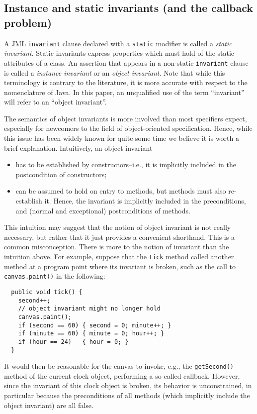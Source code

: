\documentclass{llncs}
\begin{document}
\subsection{Instance and static invariants (and the callback problem)}

A JML \texttt{invariant} clause declared with a
\texttt{static} modifier is called a \emph{static invariant}.
%
Static invariants express properties which must hold of the static
attributes of a class.
%
An assertion that appears in a non-static \texttt{invariant} clause is called
a \emph{instance invariant} or an \emph{object invariant}.
%
Note that while this terminology is contrary to the literature, it is more
accurate with respect to the nomenclature of Java.  In this paper, an
unqualified use of the term ``invariant'' will refer to an ``object
invariant''.

The semantics of object invariants is more involved than most specifiers
expect, especially for newcomers to the field of object-oriented specification.
Hence, while this issue has been widely known for quite some time
\cite{Szyperski98} we believe it is worth a brief explanation.
%
Intuitively, an object invariant
\begin{itemize}
  \item  has to be established by constructors--i.e., it is implicitly
    included in the postcondition of constructors;
  \item can be assumed to hold on entry to methods, but methods must also
    re-establish it. Hence, the invariant is implicitly included in the
    preconditions, and (normal and exceptional) postconditions of methods.
\end{itemize}

This intuition may suggest that the notion of object invariant is not really
necessary, but rather that it just provides a convenient shorthand.  This is a
common misconception.
%
There is more to the notion of invariant than the intuition above.
%
For example, suppose that the \texttt{tick} method called another method
at a program point where its invariant is broken, such as the call to
\texttt{canvas.paint()} in the following:
\begin{verbatim}
  public void tick() {
    second++;
    // object invariant might no longer hold
    canvas.paint();
    if (second == 60) { second = 0; minute++; }
    if (minute == 60) { minute = 0; hour++; }
    if (hour == 24)   { hour = 0; }
  }
\end{verbatim}
It would then be reasonable for the canvas to invoke, e.g., the
\texttt{getSecond()} method of the current clock object, performing a so-called 
callback. 
However, since the invariant of this clock object is broken, its behavior is
unconstrained, in particular because the preconditions of all methods (which
implicitly include the object invariant) are all false.
\end{document}
